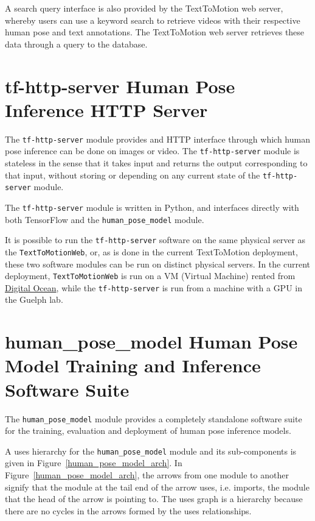 \documentclass{scrreprt}
\begin{document}
A search query interface is also provided by the TextToMotion web server,
whereby users can use a keyword search to retrieve videos with their respective
human pose and text annotations. The TextToMotion web server retrieves these
data through a query to the database.

\section{tf-http-server Human Pose Inference HTTP Server}

The \verb|tf-http-server| module provides and HTTP interface through which
human pose inference can be done on images or video. The \verb|tf-http-server|
module is stateless in the sense that it takes input and returns the output
corresponding to that input, without storing or depending on any current state
of the \verb|tf-http-server| module.

The \verb|tf-http-server| module is written in Python, and interfaces directly
with both TensorFlow and the \verb|human_pose_model| module.

It is possible to run the \verb|tf-http-server| software on the same physical
server as the \verb|TextToMotionWeb|, or, as is done in the current
TextToMotion deployment, these two software modules can be run on distinct
physical servers. In the current deployment, \verb|TextToMotionWeb| is run on a
VM (Virtual Machine) rented from
\href{https://digitalocean.com}{Digital Ocean}, while the \verb|tf-http-server|
is run from a machine with a GPU in the Guelph lab.

\section{human\_pose\_model Human Pose Model Training and Inference
         Software Suite}

The \verb|human_pose_model| module provides a completely standalone software
suite for the training, evaluation and deployment of human pose inference
models.

A uses hierarchy for the \verb|human_pose_model| module and its sub-components
is given in Figure~\ref{human_pose_model_arch}. In
Figure~\ref{human_pose_model_arch}, the arrows from one module to another
signify that the module at the tail end of the arrow uses, i.e. imports, the
module that the head of the arrow is pointing to. The uses graph is a hierarchy
because there are no cycles in the arrows formed by the uses relationships.
\end{document}
